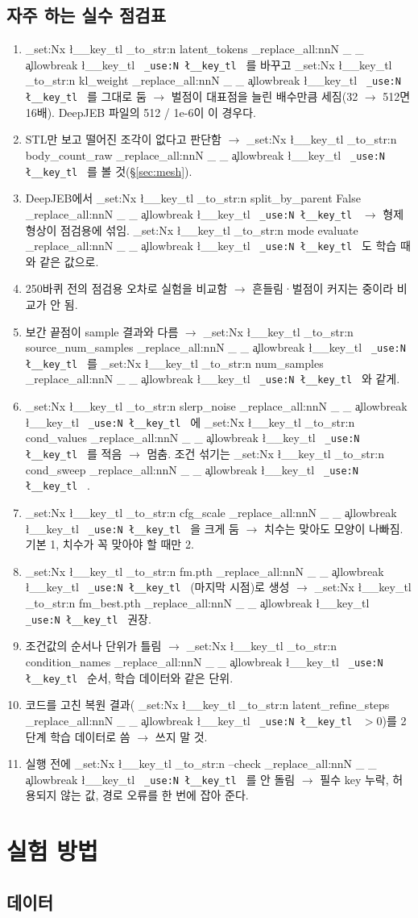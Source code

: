 \documentclass[11pt]{article}
\DeclareRobustCommand{\key}[1]{
  \tl_set:Nx \l__key_tl { \tl_to_str:n {#1} }
  \regex_replace_all:nnN { \_ } { \cO\_ \c{allowbreak} } \l__key_tl
  \texttt{ \tl_use:N \l__key_tl }
}
\begin{document}
\subsection{자주 하는 실수 점검표}

\begin{enumerate}
\item \key{latent_tokens}를 바꾸고 \key{kl_weight}를 그대로 둠 $\rightarrow$ 벌점이 대표점을 늘린 배수만큼 세짐(32 $\rightarrow$ 512면 16배). DeepJEB 파일의 512 / 1e-6이 이 경우다.
\item STL만 보고 떨어진 조각이 없다고 판단함 $\rightarrow$ \key{body_count_raw}를 볼 것(\S\ref{sec:mesh}).
\item DeepJEB에서 \key{split_by_parent False} $\rightarrow$ 형제 형상이 점검용에 섞임. \key{mode evaluate}도 학습 때와 같은 값으로.
\item 250바퀴 전의 점검용 오차로 실험을 비교함 $\rightarrow$ 흔들림·벌점이 커지는 중이라 비교가 안 됨.
\item 보간 끝점이 sample 결과와 다름 $\rightarrow$ \key{source_num_samples}를 \key{num_samples}와 같게.
\item \key{slerp_noise}에 \key{cond_values}를 적음 $\rightarrow$ 멈춤. 조건 섞기는 \key{cond_sweep}.
\item \key{cfg_scale}을 크게 둠 $\rightarrow$ 치수는 맞아도 모양이 나빠짐. 기본 1, 치수가 꼭 맞아야 할 때만 2.
\item \key{fm.pth}(마지막 시점)로 생성 $\rightarrow$ \key{fm_best.pth} 권장.
\item 조건값의 순서나 단위가 틀림 $\rightarrow$ \key{condition_names} 순서, 학습 데이터와 같은 단위.
\item 코드를 고친 복원 결과(\key{latent_refine_steps} $>0$)를 2단계 학습 데이터로 씀 $\rightarrow$ 쓰지 말 것.
\item 실행 전에 \key{--check}를 안 돌림 $\rightarrow$ 필수 key 누락, 허용되지 않는 값, 경로 오류를 한 번에 잡아 준다.
\end{enumerate}

\section{실험 방법}
\label{sec:method}

\subsection{데이터}
\end{document}
